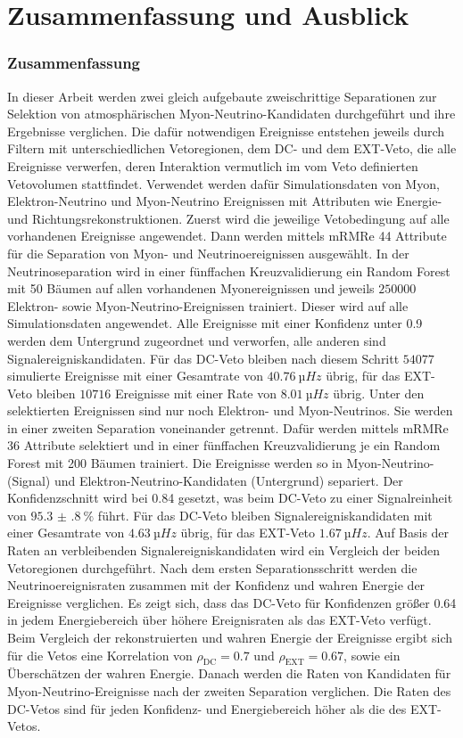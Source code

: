 \chapter{Zusammenfassung und Ausblick}
\subsection*{Zusammenfassung}
In dieser Arbeit werden zwei gleich aufgebaute zweischrittige Separationen zur Selektion von atmosphärischen Myon-Neutrino-Kandidaten durchgeführt und ihre Ergebnisse verglichen.
Die dafür notwendigen Ereignisse entstehen jeweils durch Filtern mit unterschiedlichen Vetoregionen, dem DC- und dem EXT-Veto, die alle Ereignisse verwerfen, deren Interaktion vermutlich im vom Veto definierten Vetovolumen stattfindet.
Verwendet werden dafür Simulationsdaten von Myon, Elektron-Neutrino und Myon-Neutrino Ereignissen mit Attributen wie Energie- und Richtungsrekonstruktionen.
Zuerst wird die jeweilige Vetobedingung auf alle vorhandenen Ereignisse angewendet.
Dann werden mittels mRMRe 44 Attribute für die Separation von Myon- und Neutrinoereignissen ausgewählt.
In der Neutrinoseparation wird in einer fünffachen Kreuzvalidierung ein Random Forest mit 50 Bäumen auf allen vorhandenen Myonereignissen und jeweils $\num{250000}$ Elektron- sowie Myon-Neutrino-Ereignissen trainiert.
Dieser wird auf alle Simulationsdaten angewendet.
Alle Ereignisse mit einer Konfidenz unter 0.9 werden dem Untergrund zugeordnet und verworfen, alle anderen sind Signalereigniskandidaten. 
Für das DC-Veto bleiben nach diesem Schritt $\num{54077}$ simulierte Ereignisse mit einer Gesamtrate von $\SI{40.76}{µHz}$ übrig, für das EXT-Veto bleiben $\num{10716}$ Ereignisse mit einer Rate von $\SI{8.01}{µHz}$ übrig.
Unter den selektierten Ereignissen sind nur noch Elektron- und Myon-Neutrinos. 
Sie werden in einer zweiten Separation voneinander getrennt.
Dafür werden mittels mRMRe 36 Attribute selektiert und in einer fünffachen Kreuzvalidierung je ein Random Forest mit 200 Bäumen trainiert.
Die Ereignisse werden so in Myon-Neutrino- (Signal) und Elektron-Neutrino-Kandidaten (Untergrund) separiert.
Der Konfidenzschnitt wird bei 0.84 gesetzt, was beim DC-Veto zu einer Signalreinheit von $\SI{95.3(8)}{\%}$ führt. 
Für das DC-Veto bleiben Signalereigniskandidaten mit einer Gesamtrate von $\SI{4.63}{µHz}$ übrig, für das EXT-Veto $\SI{1.67}{µHz}$.
Auf Basis der Raten an verbleibenden Signalereigniskandidaten wird ein Vergleich der beiden Vetoregionen durchgeführt.
Nach dem ersten Separationsschritt werden die Neutrinoereignisraten zusammen mit der Konfidenz und wahren Energie der Ereignisse verglichen.
Es zeigt sich, dass das DC-Veto für Konfidenzen größer 0.64 in jedem Energiebereich über höhere Ereignisraten als das EXT-Veto verfügt.
Beim Vergleich der rekonstruierten und wahren Energie der Ereignisse ergibt sich für die Vetos eine Korrelation von $ρ_\text{DC} = 0.7$ und $ρ_\text{EXT} = 0.67$, sowie ein Überschätzen der wahren Energie. 
Danach werden die Raten von Kandidaten für Myon-Neutrino-Ereignisse nach der zweiten Separation verglichen.
Die Raten des DC-Vetos sind für jeden Konfidenz- und Energiebereich höher als die des EXT-Vetos.


